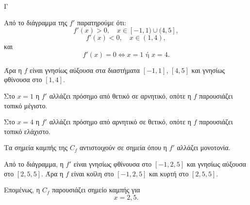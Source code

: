 
\begin{thema}{Γ}

\begin{center}
\end{center}

\begin{erwthma}
\item Από το διάγραμμα της $f'$ παρατηρούμε ότι:
\[
f'(x)>0,\quad x\in[-1,1)\cup(4,5],
\]
\[
f'(x)<0,\quad x\in(1,4),
\]
και
\[
f'(x)=0 \Leftrightarrow x=1 \text{ ή } x=4.
\]

Άρα η $f$ είναι γνησίως αύξουσα στα διαστήματα $[-1,1]$, $[4,5]$ και γνησίως φθίνουσα στο $[1,4]$.

Στο $x=1$ η $f'$ αλλάζει πρόσημο από θετικό σε αρνητικό, οπότε η $f$ παρουσιάζει τοπικό μέγιστο.

Στο $x=4$ η $f'$ αλλάζει πρόσημο από αρνητικό σε θετικό, οπότε η $f$ παρουσιάζει τοπικό ελάχιστο.

\item Τα σημεία καμπής της $C_f$ αντιστοιχούν σε σημεία όπου η $f'$ αλλάζει μονοτονία.

Από το διάγραμμα, η $f'$ είναι γνησίως φθίνουσα στο $[-1,2{,}5]$ και γνησίως αύξουσα στο $[2{,}5,5]$. Άρα η $f$ είναι κοίλη στο $[-1,2{,}5]$ και κυρτή στο $[2{,}5,5]$.

Επομένως, η $C_f$ παρουσιάζει σημείο καμπής για
\[
x=2{,}5.
\]


\end{erwthma}
\end{thema}
